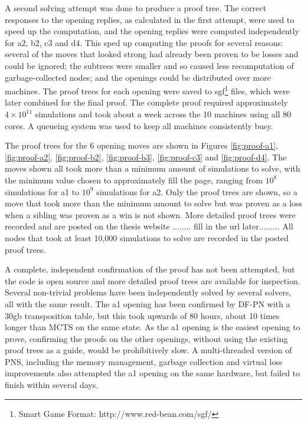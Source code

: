 A second solving attempt was done to produce a proof tree. The correct responses to the opening replies, as calculated in the first attempt, were used to speed up the computation, and the opening replies were computed independently for a2, b2, c3 and d4. This sped up computing the proofs for several reasons: several of the moves that looked strong had already been proven to be losses and could be ignored; the subtrees were smaller and so caused less recomputation of garbage-collected nodes; and the openings could be distributed over more machines. The proof trees for each opening were saved to sgf\footnote{Smart Game Format: http://www.red-bean.com/sgf/} files, which were later combined for the final proof. The complete proof required approximately $4 \times 10^{11}$ simulations and took about a week across the 10 machines using all 80 cores. A queueing system was used to keep all machines consistently busy.

The proof trees for the 6 opening moves are shown in Figures \ref{fig:proof-a1}, \ref{fig:proof-a2}, \ref{fig:proof-b2}, \ref{fig:proof-b3}, \ref{fig:proof-c3} and \ref{fig:proof-d4}. The moves shown all took more than a minimum amount of simulations to solve, with the minimum value chosen to approximately fill the page, ranging from $10^{8}$ simulations for a1 to $10^{9}$ simulations for a2. Only the proof trees are shown, so a move that took more than the minimum amount to solve but was proven as a loss when a sibling was proven as a win is not shown. More detailed proof trees were recorded and are posted on the thesis website ........ fill in the url later......... All nodes that took at least 10,000 simulations to solve are recorded in the posted proof trees.

A complete, independent confirmation of the proof has not been attempted, but the code is open source and more detailed proof trees are available for inspection. Several non-trivial problems have been independently solved by several solvers, all with the same result. The a1 opening has been confirmed by DF-PN with a 30gb transposition table, but this took upwards of 80 hours, about 10 times longer than MCTS on the same state. As the a1 opening is the easiest opening to prove, confirming the proofs on the other openings, without using the existing proof trees as a guide, would be prohibitively slow. A multi-threaded version of PNS, including the memory management, garbage collection and virtual loss improvements also attempted the a1 opening on the same hardware, but failed to finish within several days.

